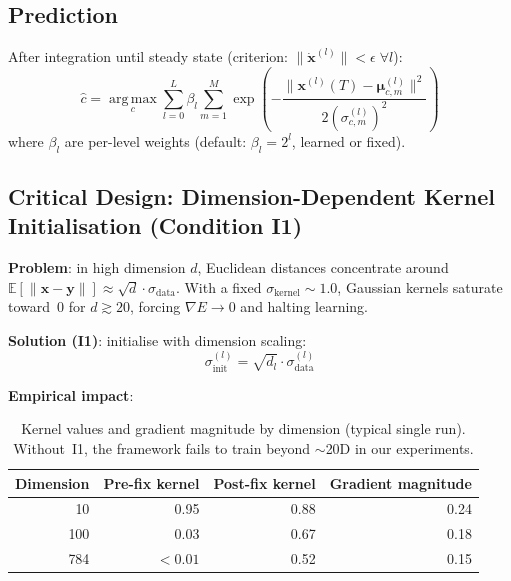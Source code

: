 \documentclass[11pt,a4paper]{article}
\begin{document}
\subsection{Prediction}

After integration until steady state (criterion: $\|\dot{\mathbf{x}}^{(l)}\| < \epsilon\;\forall l$):
\begin{equation}
  \hat{c} = \operatorname*{arg\,max}_c \sum_{l=0}^{L} \beta_l \sum_{m=1}^{M}
    \exp\!\left(-\frac{\|\mathbf{x}^{(l)}(T) - \boldsymbol{\mu}^{(l)}_{c,m}\|^2}
                      {2(\sigma^{(l)}_{c,m})^2}\right)
\end{equation}
where $\beta_l$ are per-level weights (default: $\beta_l = 2^l$, learned or fixed).

\subsection{Critical Design: Dimension-Dependent Kernel Initialisation (Condition I1)}

\textbf{Problem}: in high dimension $d$, Euclidean distances concentrate around
$\mathbb{E}[\|\mathbf{x}-\mathbf{y}\|] \approx \sqrt{d}\cdot\sigma_{\mathrm{data}}$.
With a fixed $\sigma_{\mathrm{kernel}} \sim 1.0$, Gaussian kernels saturate toward~0 for
$d \gtrsim 20$, forcing $\nabla E \to 0$ and halting learning.

\textbf{Solution (I1)}: initialise with dimension scaling:
\begin{equation}
  \sigma^{(l)}_{\mathrm{init}} = \sqrt{d_l} \cdot \sigma^{(l)}_{\mathrm{data}}
\end{equation}

\textbf{Empirical impact}:

\begin{table}[h]
\centering
\begin{tabular}{rrrr}
\toprule
\textbf{Dimension} & \textbf{Pre-fix kernel} & \textbf{Post-fix kernel} & \textbf{Gradient magnitude} \\
\midrule
10  & 0.95     & 0.88 & 0.24 \\
100 & 0.03     & 0.67 & 0.18 \\
784 & $<0.01$  & 0.52 & 0.15 \\
\bottomrule
\end{tabular}
\caption{Kernel values and gradient magnitude by dimension (typical single run).
Without~I1, the framework fails to train beyond $\sim$20D in our experiments.}
\label{tab:kernelfix}
\end{table}
\end{document}
